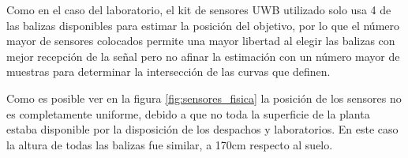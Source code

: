 Como en el caso del laboratorio, el kit de sensores UWB utilizado solo usa 4 de las balizas disponibles para estimar la posición del objetivo, por lo que el número mayor de sensores colocados permite una mayor libertad al elegir las balizas con mejor recepción de la señal pero no afinar la estimación con un número mayor de muestras para determinar la intersección de las curvas que definen.

Como es posible ver en la figura \ref{fig:sensores_fisica} la posición de los sensores no es completamente uniforme, debido a que no toda la superficie de la planta estaba disponible por la disposición de los despachos y laboratorios.
En este caso la altura de todas las balizas fue similar, a 170cm respecto al suelo.